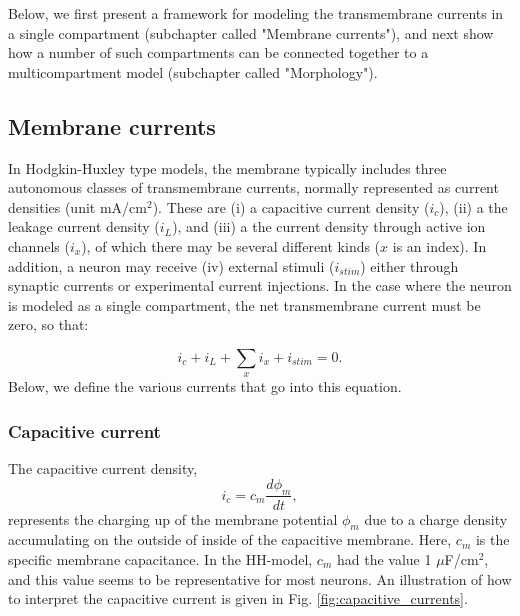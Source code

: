 Below, we first present a framework for modeling the transmembrane currents in a single compartment (subchapter called "Membrane currents"), and next show how a number of such compartments can be connected together to a multicompartment model (subchapter called "Morphology").


\subsection{Membrane currents}
In Hodgkin-Huxley type models, the membrane typically includes three autonomous classes of transmembrane currents, normally represented as current densities (unit mA/cm$^2$). These are (i) a capacitive current density ($i_c$), (ii) a the leakage current density ($i_L$), and (iii) a the current density through active ion channels ($i_x$), of which there may be several different kinds ($x$ is an index). In addition, a neuron may receive  (iv) external stimuli ($i_{stim}$) either through synaptic currents or experimental current injections. In the case where the neuron is modeled as a single compartment, the net transmembrane current must be zero, so that:

\begin{equation}
i_c + i_L + \sum_x{i_x} +  i_{stim} = 0.
\label{eq:singlecomp_zerosum}
\end{equation}
Below, we define the various currents that go into this equation.

\subsubsection{Capacitive current}
The capacitive current density,
\begin{equation}
i_c = c_m \frac{d\phi_m}{dt},
\label{eq:HHcap}
\end{equation}
represents the charging up of the membrane potential $\phi_m$ due to a charge density accumulating on the outside of inside of the capacitive membrane. Here, $c_m$ is the specific membrane capacitance. In the HH-model, $c_m$ had the value
1 $\mu$F/cm$^2$, and this value seems to be representative for most neurons.  An illustration of how to interpret the capacitive current is given in Fig. \ref{fig:capacitive_currents}. 

